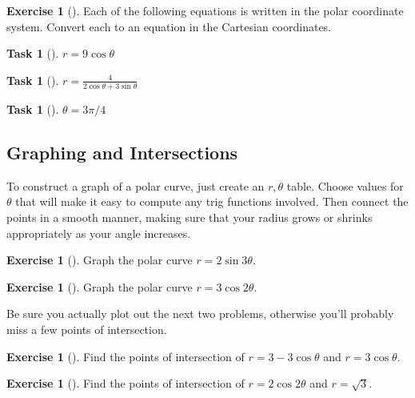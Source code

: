 \documentclass[10pt,]{book}
\theoremstyle{plain}
\theoremstyle{definition}
\theoremstyle{definition}
\theoremstyle{definition}
\theoremstyle{definition}
\newtheorem{exploration}[project]{Exercise}
\newtheorem{task}[project]{Task}
\theoremstyle{definition}
\numberwithin{equation}{section}
\newcommand{\ds}{\displaystyle}
\begin{document}
\begin{exploration}[]\label{exploration-90}
Each of the following equations is written in the polar coordinate system. Convert each to an equation in the Cartesian coordinates.%
\begin{task}[]\label{task-152}
\(r=9\cos\theta\)%
\end{task}
\begin{task}[]\label{task-153}
\(\ds r=\frac{4}{2\cos\theta+3\sin\theta}\)%
\end{task}
\begin{task}[]\label{task-154}
\(\theta = 3\pi/4\)%
\end{task}
\end{exploration}
\typeout{************************************************}
\typeout{************************************************}
\subsection[{Graphing and Intersections}]{Graphing and Intersections}\label{subsection-20}
To construct a graph of a polar curve, just create an \(r,\theta\) table. Choose values for \(\theta\) that will make it easy to compute any trig functions involved. Then connect the points in a smooth manner, making sure that your radius grows or shrinks appropriately as your angle increases.%
\begin{exploration}[]\label{exploration-91}
Graph the polar curve \(r=2\sin 3\theta\).%
\end{exploration}
\begin{exploration}[]\label{exploration-92}
Graph the polar curve \(r=3\cos 2\theta\).%
\end{exploration}
Be sure you actually plot out the next two problems, otherwise you'll probably miss a few points of intersection.%
\begin{exploration}[]\label{exploration-93}
Find the points of intersection of \(r=3-3\cos\theta\) and \(r=3\cos\theta\).%
\end{exploration}
\begin{exploration}[]\label{exploration-94}
Find the points of intersection of \(r=2\cos 2\theta\) and \(r=\sqrt 3\).%
\end{exploration}
\typeout{************************************************}
\typeout{************************************************}
\end{document}
